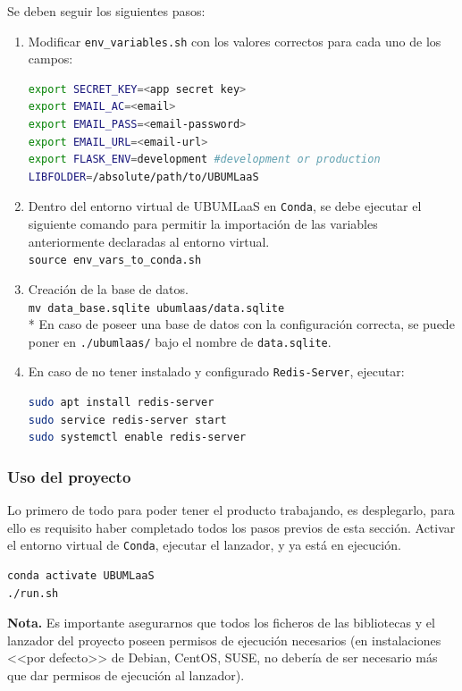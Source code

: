 Se deben seguir los siguientes pasos:
\begin{enumerate}
\item Modificar \texttt{env\_variables.sh} con los valores correctos para cada uno de los campos:
\begin{lstlisting}[language=bash]
export SECRET_KEY=<app secret key>
export EMAIL_AC=<email>
export EMAIL_PASS=<email-password>
export EMAIL_URL=<email-url>
export FLASK_ENV=development #development or production
LIBFOLDER=/absolute/path/to/UBUMLaaS
\end{lstlisting}
\item Dentro del entorno virtual de UBUMLaaS en \texttt{Conda}, se debe ejecutar el siguiente comando para permitir la importación de las variables anteriormente declaradas al entorno virtual.\\
\texttt{source env\_vars\_to\_conda.sh}
\item Creación de la base de datos.\\
\texttt{mv data\_base.sqlite ubumlaas/data.sqlite}\\
* En caso de poseer una base de datos con la configuración correcta, se puede poner en \texttt{./ubumlaas/} bajo el nombre de \texttt{data.sqlite}.
\item En caso de no tener instalado y configurado \texttt{Redis-Server}, ejecutar:
\begin{lstlisting}[language=bash]
sudo apt install redis-server
sudo service redis-server start
sudo systemctl enable redis-server
\end{lstlisting}
\end{enumerate}

\subsubsection{Uso del proyecto}
Lo primero de todo para poder tener el producto trabajando, es desplegarlo, para ello es requisito haber completado todos los pasos previos de esta sección. Activar el entorno virtual de \texttt{Conda}, ejecutar el lanzador, y ya está en ejecución.
\begin{lstlisting}[language=bash]
conda activate UBUMLaaS
./run.sh
\end{lstlisting}
\textbf{Nota.} Es importante asegurarnos que todos los ficheros de las bibliotecas y el lanzador del proyecto poseen permisos de ejecución necesarios (en instalaciones <<por defecto>> de Debian, CentOS, SUSE, no debería de ser necesario más que dar permisos de ejecución al lanzador).

